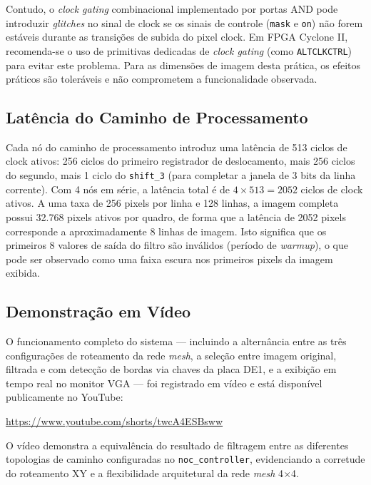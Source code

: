 \documentclass[12pt, a4paper]{article}
\begin{document}
	Contudo, o \textit{clock gating} combinacional implementado por portas AND
	pode introduzir \textit{glitches} no sinal de clock se os sinais de controle
	(\texttt{mask} e \texttt{on}) não forem estáveis durante as transições de
	subida do pixel clock. Em FPGA Cyclone II, recomenda-se o uso de primitivas
	dedicadas de \textit{clock gating} (como \texttt{ALTCLKCTRL}) para evitar
	este problema. Para as dimensões de imagem desta prática, os efeitos práticos
	são toleráveis e não comprometem a funcionalidade observada.
	
	\subsection{Latência do Caminho de Processamento}
	
	Cada nó do caminho de processamento introduz uma latência de 513 ciclos de
	clock ativos: 256 ciclos do primeiro registrador de deslocamento, mais 256
	ciclos do segundo, mais 1 ciclo do \texttt{shift\_3} (para completar a janela
	de 3 bits da linha corrente). Com 4 nós em série, a latência total é de
	$4 \times 513 = 2052$ ciclos de clock ativos. A uma taxa de 256 pixels por
	linha e 128 linhas, a imagem completa possui 32.768 pixels ativos por quadro,
	de forma que a latência de 2052 pixels corresponde a aproximadamente 8 linhas
	de imagem. Isto significa que os primeiros 8 valores de saída do filtro são
	inválidos (período de \textit{warmup}), o que pode ser observado como uma
	faixa escura nos primeiros pixels da imagem exibida.
	
	\subsection{Demonstração em Vídeo}
	
	O funcionamento completo do sistema --- incluindo a alternância entre as três
	configurações de roteamento da rede \textit{mesh}, a seleção entre imagem
	original, filtrada e com detecção de bordas via chaves da placa DE1, e a
	exibição em tempo real no monitor VGA --- foi registrado em vídeo e está
	disponível publicamente no YouTube:
	
	\begin{center}
		\url{https://www.youtube.com/shorts/twcA4ESBsww}
	\end{center}
	
	\noindent O vídeo demonstra a equivalência do resultado de filtragem entre as
	diferentes topologias de caminho configuradas no \texttt{noc\_controller},
	evidenciando a corretude do roteamento XY e a flexibilidade arquitetural da
	rede \textit{mesh} 4$\times$4.
	
\end{document}
